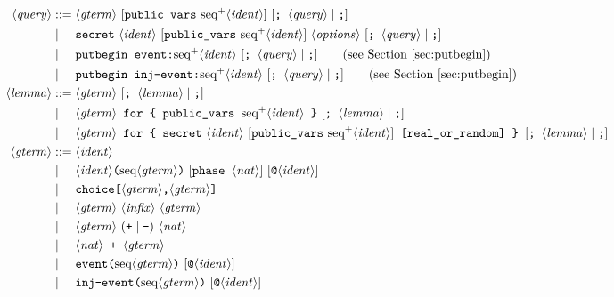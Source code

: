 \documentclass{book}
\newcommand{\nonterm}[1]{\langle\mathit{#1}\rangle}
\newcommand{\seq}[1]{\textrm{seq}\nonterm{#1}}
\newcommand{\neseq}[1]{\textrm{seq}^+\nonterm{#1}}
\begin{document}
\begin{figure}
\begin{align*}
\nonterm{query} &::=
	\nonterm{gterm}\textrm{ }[\texttt{public\_vars}\ \neseq{ident}]\textrm{ }[\texttt{; }\nonterm{query} \mid \texttt{;}]\\
&\mid\phantom{:=}
        \texttt{secret}\ \nonterm{ident}\textrm{ }[\texttt{public\_vars}\ \neseq{ident}]\textrm{ }\nonterm{options}\textrm{ }[\texttt{; }\nonterm{query} \mid \texttt{;}]\\
&\mid\phantom{:=}
	\texttt{putbegin event:}\neseq{ident}\textrm{ }[\texttt{; }\nonterm{query} \mid \texttt{;}]\tag{see Section~\ref{sec:putbegin}}\\
&\mid\phantom{:=}
   \texttt{putbegin inj-event:}\neseq{ident}\textrm{ }[\texttt{; }\nonterm{query} \mid \texttt{;}]\tag{see Section~\ref{sec:putbegin}}\\
%
\nonterm{lemma} &::=
	\nonterm{gterm}\textrm{ }[\texttt{; }\nonterm{lemma} \mid \texttt{;}]\\
&\mid\phantom{:=}
\nonterm{gterm}\texttt{ for \{ public\_vars }\neseq{ident}\texttt{ \}}\textrm{ }[\texttt{; }\nonterm{lemma} \mid \texttt{;}]\\
&\mid\phantom{:=}
        \nonterm{gterm}\texttt{ for \{ secret}\ \nonterm{ident}\textrm{ }[\texttt{public\_vars}\ \neseq{ident}]\texttt{ [real\_or\_random] \} }[\texttt{; }\nonterm{lemma} \mid \texttt{;}]\\
%
\nonterm{gterm} &::=
	\nonterm{ident}\\
&\mid\phantom{:=}
	\nonterm{ident} \texttt{(}\seq{gterm} \texttt{)}\textrm{ }[\texttt{phase }\nonterm{nat}]\textrm{ }[\texttt{@}\nonterm{ident}]\\
&\mid\phantom{:=}
	\texttt{choice[} \nonterm{gterm} \texttt{,} \nonterm{gterm} \texttt{]}\\
&\mid\phantom{:=}
    \nonterm{gterm}\ \nonterm{infix}\ \nonterm{gterm}\\
&\mid\phantom{:=}
       \nonterm{gterm}\ (\texttt{+} \mid \texttt{-})\ \nonterm{nat}\\
&\mid\phantom{:=}
       \nonterm{nat} \texttt{ + }\nonterm{gterm}\\
&\mid\phantom{:=}
       \texttt{event(} \seq{gterm} \texttt{)}\textrm{ }[\texttt{@}\nonterm{ident}]\\
&\mid\phantom{:=}
       \texttt{inj-event(} \seq{gterm} \texttt{)}\textrm{ }[\texttt{@}\nonterm{ident}]\\

\end{align*}
\end{figure}
\end{document}
